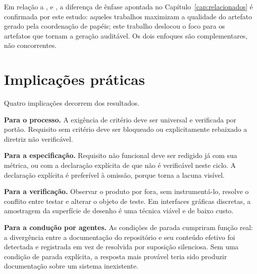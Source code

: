 Em relação a ,  e
, a diferença de ênfase apontada no
Capítulo~\ref{cap:relacionados} é confirmada por este estudo: aqueles trabalhos
maximizam a qualidade do artefato gerado pela coordenação de papéis; este trabalho
deslocou o foco para os artefatos que tornam a geração auditável. Os dois enfoques
são complementares, não concorrentes.

\section{Implicações práticas}
\label{sec:disc-implicacoes}

Quatro implicações decorrem dos resultados.

\textbf{Para o processo.} A exigência de critério deve ser universal e verificada
por portão. Requisito sem critério deve ser bloqueado ou explicitamente
rebaixado a diretriz não verificável.

\textbf{Para a especificação.} Requisito não funcional deve ser redigido já com
sua métrica, ou com a declaração explícita de que não é verificável neste ciclo.
A declaração explícita é preferível à omissão, porque torna a lacuna visível.

\textbf{Para a verificação.} Observar o produto por fora, sem instrumentá-lo,
resolve o conflito entre testar e alterar o objeto de teste. Em interfaces
gráficas discretas, a amostragem da superfície de desenho é uma técnica viável e
de baixo custo.

\textbf{Para a condução por agentes.} As condições de parada cumpriram função
real: a divergência entre a documentação do repositório e seu conteúdo efetivo
foi detectada e registrada em vez de resolvida por suposição silenciosa. Sem uma
condição de parada explícita, a resposta mais provável teria sido produzir
documentação sobre um sistema inexistente.

